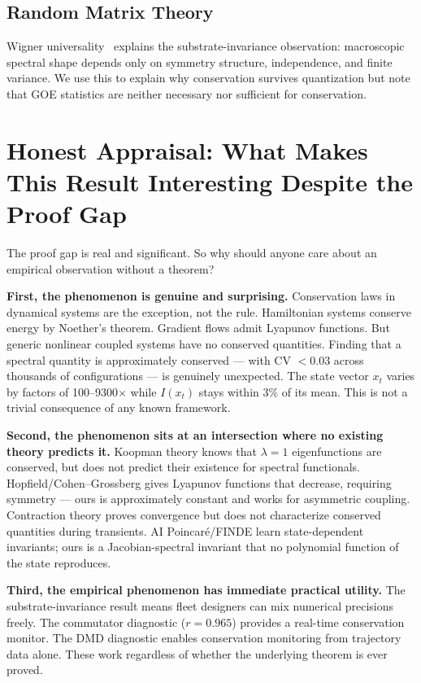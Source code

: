 \documentclass[11pt]{article}
\begin{document}
\subsection{Random Matrix Theory}

Wigner universality~\citep{wigner1955, tao2012} explains the substrate-invariance observation: macroscopic spectral shape depends only on symmetry structure, independence, and finite variance. We use this to explain why conservation survives quantization but note that GOE statistics are neither necessary nor sufficient for conservation.

\section{Honest Appraisal: What Makes This Result Interesting Despite the Proof Gap}

The proof gap is real and significant. So why should anyone care about an empirical observation without a theorem?

\textbf{First, the phenomenon is genuine and surprising.} Conservation laws in dynamical systems are the exception, not the rule. Hamiltonian systems conserve energy by Noether's theorem. Gradient flows admit Lyapunov functions. But generic nonlinear coupled systems have no conserved quantities. Finding that a spectral quantity is approximately conserved --- with CV $< 0.03$ across thousands of configurations --- is genuinely unexpected. The state vector $x_t$ varies by factors of 100--9300$\times$ while $I(x_t)$ stays within 3\% of its mean. This is not a trivial consequence of any known framework.

\textbf{Second, the phenomenon sits at an intersection where no existing theory predicts it.} Koopman theory knows that $\lambda = 1$ eigenfunctions are conserved, but does not predict their existence for spectral functionals. Hopfield/Cohen--Grossberg gives Lyapunov functions that decrease, requiring symmetry --- ours is approximately constant and works for asymmetric coupling. Contraction theory proves convergence but does not characterize conserved quantities during transients. AI Poincar\'e/FINDE learn state-dependent invariants; ours is a Jacobian-spectral invariant that no polynomial function of the state reproduces.

\textbf{Third, the empirical phenomenon has immediate practical utility.} The substrate-invariance result means fleet designers can mix numerical precisions freely. The commutator diagnostic ($r = 0.965$) provides a real-time conservation monitor. The DMD diagnostic enables conservation monitoring from trajectory data alone. These work regardless of whether the underlying theorem is ever proved.
\end{document}
